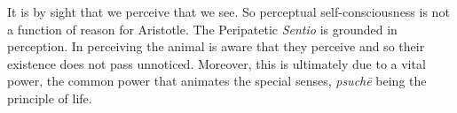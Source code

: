 It is by sight that we perceive that we see. So perceptual self-consciousness is not a function of reason for Aristotle. The Peripatetic \emph{Sentio} is grounded in perception. In perceiving the animal is aware that they perceive and so their existence does not pass unnoticed. Moreover, this is ultimately due to a vital power, the common power that animates the special senses, \emph{psuchē} being the principle of life.


